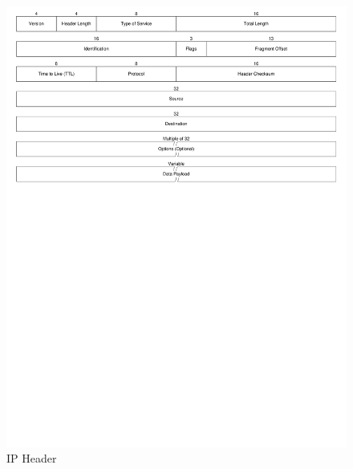 \begin{landscape}
	\begin{figure}[p]
		\begin{centering}
			\includegraphics{Protocol/Figures/protocol-ip_header.pdf}
			\caption[IP Header]{IP Header \cite{ref:2005-kozierok-tcpip_guide}}
			\label{fig:protocol:ip_header}
		\end{centering}
	\end{figure}
\end{landscape}

